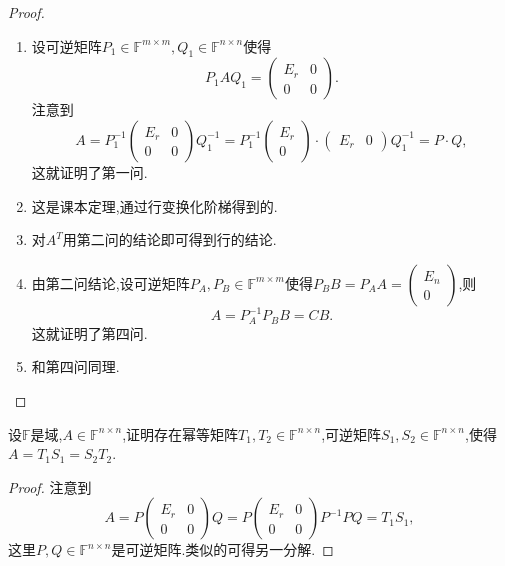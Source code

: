 \documentclass[../../main.tex]{subfiles}
\begin{document}
\begin{proof}
\begin{enumerate}
\item 设可逆矩阵\( P_1 \in \mathbb{F}^{m \times m}, Q_1 \in \mathbb{F}^{n \times n} \)使得
\[
P_1 A Q_1 = \begin{pmatrix} E_r & 0 \\ 0 & 0 \end{pmatrix}.
\]
注意到
\[
A = P_1^{-1} \begin{pmatrix} E_r & 0 \\ 0 & 0 \end{pmatrix} Q_1^{-1} = P_1^{-1} \begin{pmatrix} E_r \\ 0 \end{pmatrix} \cdot \begin{pmatrix} E_r & 0 \end{pmatrix} Q_1^{-1} = P \cdot Q,
\]
这就证明了第一问.

\item 这是课本定理,通过行变换化阶梯得到的.

\item 对\( A^T \)用第二问的结论即可得到行的结论.

\item 由第二问结论,设可逆矩阵\( P_A, P_B \in \mathbb{F}^{m \times m} \)使得\( P_B B = P_A A = \begin{pmatrix} E_n \\ 0 \end{pmatrix} \),则
\[
A = P_A^{-1} P_B B = CB.
\]
这就证明了第四问.

\item 和第四问同理.
\end{enumerate}
\end{proof}

\begin{theorem}[幂等分解]\label{theorem:幂等分解}
设\( \mathbb{F} \)是域,\( A \in \mathbb{F}^{n \times n} \),证明存在幂等矩阵\( T_1, T_2 \in \mathbb{F}^{n \times n} \),可逆矩阵\( S_1, S_2 \in \mathbb{F}^{n \times n} \),使得\( A = T_1 S_1 = S_2 T_2 \).
\end{theorem}
\begin{proof}
注意到
\[
A = P \begin{pmatrix} E_r & 0 \\ 0 & 0 \end{pmatrix} Q = P \begin{pmatrix} E_r & 0 \\ 0 & 0 \end{pmatrix} P^{-1} PQ = T_1 S_1,
\]
这里\( P, Q \in \mathbb{F}^{n \times n} \)是可逆矩阵.类似的可得另一分解.
\end{proof}
\end{document}

